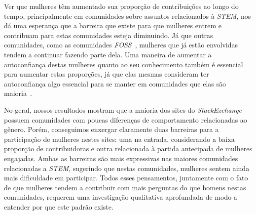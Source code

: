 Ver que mulheres têm aumentado sua proporção de contribuições ao longo do tempo, principalmente em comunidades sobre assuntos relacionados à \emph{STEM}, nos dá uma esperança que a barreira que existe para que mulheres entrem e contribuam para estas comunidades esteja diminuindo. Já que outras comunidades, como as comunidades \emph{FOSS}~\cite{powell2010gender}, mulheres que já estão envolvidas tendem a continuar fazendo parte dela. Uma maneira de aumentar a autoconfiança destas mulheres quanto ao seu conhecimento também é essencial para aumentar estas proporções, já que elas mesmas consideram ter autoconfiança algo essencial para se manter em comunidades que elas são maioria~\cite{powell2010gender}.

No geral, nossos resultados mostram que a maioria dos sites do \emph{StackExchange} possuem comunidades com poucas diferenças de comportamento relacionadas ao gênero. Porém, conseguimos enxergar claramente duas barreiras para a participação de mulheres nestes sites: uma na entrada, considerando a baixa proporção de contribuidoras e outra relacionada à partida antecipada de mulheres engajadas. Ambas as barreiras são mais expressivas nas maiores comunidades relacionadas a \emph{STEM}, sugerindo que nestas comunidades, mulheres sentem ainda mais dificuldade em participar. Todos esses pensamentos, juntamente com o fato de que mulheres tendem a contribuir com mais perguntas do que homens nestas comunidades, requerem uma investigação qualitativa aprofundada de modo a entender por que este padrão existe.





